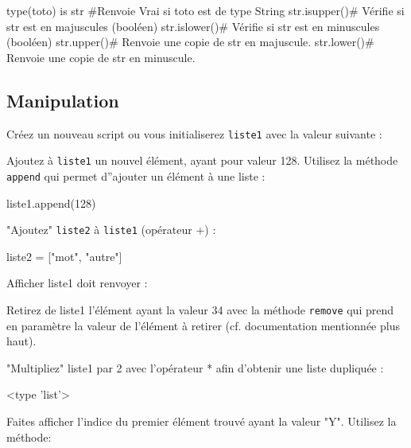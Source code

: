 \begin{python}
type(toto) is str #Renvoie Vrai si toto est de type String
str.isupper()# Vérifie si str est en majuscules (booléen)
str.islower()# Vérifie si str est en minuscules (booléen)
str.upper()# Renvoie une copie de str en majuscule.
str.lower()# Renvoie une copie de str en minuscule.
\end{python}

\subsection{Manipulation}

\exer

Créez un nouveau script ou vous initialiserez \texttt{liste1} avec la valeur suivante :
\begin{python}
[1, 2, 3, 4, 5, 65, 34, 6, 'B', 43, 'A', 'Y', 54, 'P']
\end{python}

Ajoutez à \texttt{liste1} un nouvel élément, ayant pour valeur 128. Utilisez la méthode \texttt{append} qui permet d''ajouter un élément à une liste :

\begin{python}
liste1.append(128)
\end{python}

 "Ajoutez" \texttt{liste2} à \texttt{liste1} (opérateur +) :

\begin{python}
liste2 = ["mot", "autre"]
\end{python}

Afficher liste1 doit renvoyer :

\begin{python}
\end{python}

 Retirez de liste1 l'élément ayant la valeur 34 avec la méthode \texttt{remove} qui prend en paramètre la valeur de l'élément à retirer (cf. documentation mentionnée plus haut).

 "Multipliez" liste1 par 2 avec l'opérateur * afin d'obtenir une liste dupliquée :

\begin{python}
 <type 'list'>
\end{python}

Faites afficher l'indice du premier élément trouvé ayant la valeur "Y". Utilisez la méthode:

